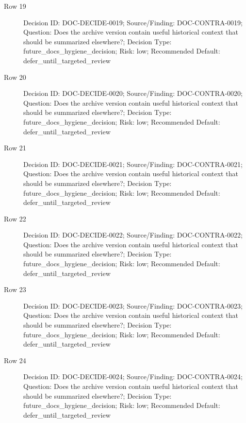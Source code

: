 \documentclass[10.5pt,a4paper,openany]{book}
\begin{document}
\begin{description}
\item[Row 19] Decision ID: DOC-\allowbreak{}DECIDE-\allowbreak{}0019; Source/\allowbreak{}Finding: DOC-\allowbreak{}CONTRA-\allowbreak{}0019; Question: Does the archive version contain useful historical context that should be summarized elsewhere?; Decision Type: future\_\allowbreak{}docs\_\allowbreak{}hygiene\_\allowbreak{}decision; Risk: low; Recommended Default: defer\_\allowbreak{}until\_\allowbreak{}targeted\_\allowbreak{}review
\item[Row 20] Decision ID: DOC-\allowbreak{}DECIDE-\allowbreak{}0020; Source/\allowbreak{}Finding: DOC-\allowbreak{}CONTRA-\allowbreak{}0020; Question: Does the archive version contain useful historical context that should be summarized elsewhere?; Decision Type: future\_\allowbreak{}docs\_\allowbreak{}hygiene\_\allowbreak{}decision; Risk: low; Recommended Default: defer\_\allowbreak{}until\_\allowbreak{}targeted\_\allowbreak{}review
\item[Row 21] Decision ID: DOC-\allowbreak{}DECIDE-\allowbreak{}0021; Source/\allowbreak{}Finding: DOC-\allowbreak{}CONTRA-\allowbreak{}0021; Question: Does the archive version contain useful historical context that should be summarized elsewhere?; Decision Type: future\_\allowbreak{}docs\_\allowbreak{}hygiene\_\allowbreak{}decision; Risk: low; Recommended Default: defer\_\allowbreak{}until\_\allowbreak{}targeted\_\allowbreak{}review
\item[Row 22] Decision ID: DOC-\allowbreak{}DECIDE-\allowbreak{}0022; Source/\allowbreak{}Finding: DOC-\allowbreak{}CONTRA-\allowbreak{}0022; Question: Does the archive version contain useful historical context that should be summarized elsewhere?; Decision Type: future\_\allowbreak{}docs\_\allowbreak{}hygiene\_\allowbreak{}decision; Risk: low; Recommended Default: defer\_\allowbreak{}until\_\allowbreak{}targeted\_\allowbreak{}review
\item[Row 23] Decision ID: DOC-\allowbreak{}DECIDE-\allowbreak{}0023; Source/\allowbreak{}Finding: DOC-\allowbreak{}CONTRA-\allowbreak{}0023; Question: Does the archive version contain useful historical context that should be summarized elsewhere?; Decision Type: future\_\allowbreak{}docs\_\allowbreak{}hygiene\_\allowbreak{}decision; Risk: low; Recommended Default: defer\_\allowbreak{}until\_\allowbreak{}targeted\_\allowbreak{}review
\item[Row 24] Decision ID: DOC-\allowbreak{}DECIDE-\allowbreak{}0024; Source/\allowbreak{}Finding: DOC-\allowbreak{}CONTRA-\allowbreak{}0024; Question: Does the archive version contain useful historical context that should be summarized elsewhere?; Decision Type: future\_\allowbreak{}docs\_\allowbreak{}hygiene\_\allowbreak{}decision; Risk: low; Recommended Default: defer\_\allowbreak{}until\_\allowbreak{}targeted\_\allowbreak{}review

\end{description}
\end{document}
